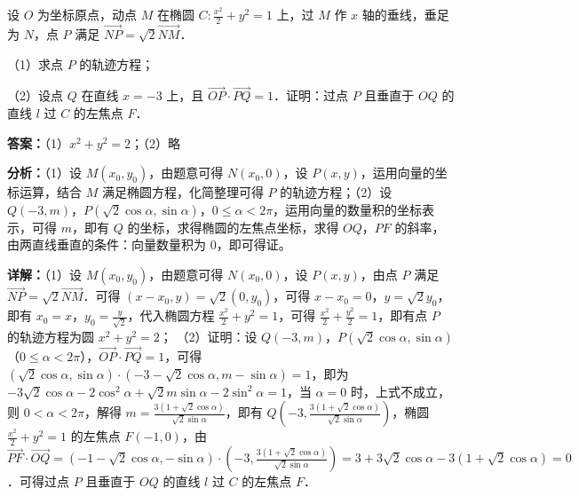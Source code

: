 \begin{question}[points=12]
设 $O$ 为坐标原点，动点 $M$ 在椭圆 $C:\frac{x^2}{2}+y^2=1$ 上，过 $M$ 作 $x$ 轴的垂线，垂足为 $N$，点 $P$ 满足 $\overrightarrow{NP}=\sqrt{2}\overrightarrow{NM}$．

（1）求点 $P$ 的轨迹方程；

（2）设点 $Q$ 在直线 $x=-3$ 上，且 $\overrightarrow{OP}\cdot\overrightarrow{PQ}=1$．证明：过点 $P$ 且垂直于 $OQ$ 的直线 $l$ 过 $C$ 的左焦点 $F$．
\begin{solution}
\textbf{答案：}（1）$x^2+y^2=2$；（2）略

\textbf{分析：}（1）设 $M(x_0,y_0)$，由题意可得 $N(x_0,0)$，设 $P(x,y)$，运用向量的坐标运算，结合 $M$ 满足椭圆方程，化简整理可得 $P$ 的轨迹方程；（2）设 $Q(-3,m)$，$P(\sqrt{2}\cos\alpha,\sin\alpha)$，$0\le\alpha<2\pi$，运用向量的数量积的坐标表示，可得 $m$，即有 $Q$ 的坐标，求得椭圆的左焦点坐标，求得 $OQ$，$PF$ 的斜率，由两直线垂直的条件：向量数量积为 $0$，即可得证。

\textbf{详解：}（1）设 $M(x_0,y_0)$，由题意可得 $N(x_0,0)$，设 $P(x,y)$，由点 $P$ 满足 $\overrightarrow{NP}=\sqrt{2}\overrightarrow{NM}$．可得 $(x-x_0,y)=\sqrt{2}(0,y_0)$，可得 $x-x_0=0$，$y=\sqrt{2}y_0$，即有 $x_0=x$，$y_0=\frac{y}{\sqrt{2}}$，代入椭圆方程 $\frac{x^2}{2}+y^2=1$，可得 $\frac{x^2}{2}+\frac{y^2}{2}=1$，即有点 $P$ 的轨迹方程为圆 $x^2+y^2=2$；
（2）证明：设 $Q(-3,m)$，$P(\sqrt{2}\cos\alpha,\sin\alpha)$（$0\le\alpha<2\pi$），$\overrightarrow{OP}\cdot\overrightarrow{PQ}=1$，可得 $(\sqrt{2}\cos\alpha,\sin\alpha)\cdot(-3-\sqrt{2}\cos\alpha,m-\sin\alpha)=1$，即为 $-3\sqrt{2}\cos\alpha-2\cos^2\alpha+\sqrt{2}m\sin\alpha-2\sin^2\alpha=1$，当 $\alpha=0$ 时，上式不成立，则 $0<\alpha<2\pi$，解得 $m=\frac{3(1+\sqrt{2}\cos\alpha)}{\sqrt{2}\sin\alpha}$，即有 $Q(-3,\frac{3(1+\sqrt{2}\cos\alpha)}{\sqrt{2}\sin\alpha})$，椭圆 $\frac{x^2}{2}+y^2=1$ 的左焦点 $F(-1,0)$，由 $\overrightarrow{PF}\cdot\overrightarrow{OQ}=(-1-\sqrt{2}\cos\alpha,-\sin\alpha)\cdot(-3,\frac{3(1+\sqrt{2}\cos\alpha)}{\sqrt{2}\sin\alpha})=3+3\sqrt{2}\cos\alpha-3(1+\sqrt{2}\cos\alpha)=0$．可得过点 $P$ 且垂直于 $OQ$ 的直线 $l$ 过 $C$ 的左焦点 $F$．
\end{solution}
\end{question}

